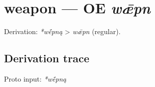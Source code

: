 \documentclass[
  british,
  a4paper,
  openany]{book}
\providecommand{\texorpdfstring}[2]{#1}
\begin{document}
\section{\texorpdfstring{weapon --- OE
\emph{wǣpn}}{weapon --- OE wǣpn}}\label{weapon-oe-wux1e3pn}


Derivation: \emph{*wḗpną} \textgreater{} \emph{wǣpn} (regular).

\subsection{Derivation trace}\label{derivation-trace-65}

Proto input: \emph{*wḗpną}

\begingroup
\setlength{\fboxsep}{6pt}
\end{document}
